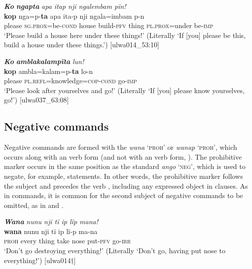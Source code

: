 \ea%
    \label{ex:syntax:100}
          \textbf{\textit{Ko}} \textbf{\textit{ngapta}} \textit{apa itap nji ngalembam pïn!}\\
\gll    \textbf{kop}  nga=p-\textbf{ta}        apa    ita-p    nji ngala=imbam    p-n\\
    please  \textsc{sg.prox}=be\textsc{{}-cond} house  build-\textsc{pfv}  thing    \textsc{pl.prox=}under  be-\textsc{imp}\\
\glt `Please build a house here under these things!’ (Literally ‘If [you] please be this, build a house under these things.’) [ulwa014\_53:10]
\z

\ea%
    \label{ex:syntax:101}
          \textbf{\textit{Ko}} \textbf{\textit{amblakalampïta}} \textit{lun!}\\
\gll    \textbf{kop}  ambla=kalam=p-\textbf{ta}        lo-n\\
    please  \textsc{pl.refl}=knowledge=\textsc{cop-cond}   go-\textsc{imp}\\
\glt `Please look after yourselves and go!’ (Literally ‘If [you] please know yourselves, go!’) [ulwa037\_63:08]
\z

\subsection{Negative commands}\label{sec:13.2.4}


Negative commands are formed with the  \textit{wana} \textsc{‘proh}’ or \textit{wanap} \textsc{‘proh}’, which occurs along with an  verb form (and not with an  verb form, ). The prohibitive marker occurs in the same position as the standard  \textit{ango} \textsc{‘neg}’, which is used to negate, for example,  statements. In other words, the prohibitive marker follows the subject and precedes the verb , including any expressed object in  clauses. As in  commands, it is common for the second  subject of negative commands to be omitted, as in  and .

\ea%
    \label{ex:syntax:102}
          \textbf{\textit{Wana}} \textit{nunu nji tï ip lïp mana!}\\
\gll    \textbf{wana}  nunu  nji    tï    ip    lï-p      ma-na\\
    \textsc{proh}  every  thing  take  nose  put-\textsc{pfv}  go-\textsc{irr}\\
\glt `Don’t go destroying everything!’ (Literally ‘Don’t go, having put nose to everything!’) [ulwa014†]
\z

